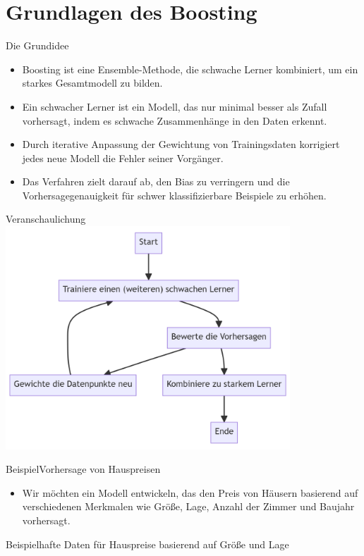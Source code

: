 \documentclass[hyperref={bookmarks=false},11pt,dvipsnames]{beamer}
\begin{document}
\section{Grundlagen des Boosting}
\begin{frame}[t]{Die Grundidee}
	\begin{itemize}
		\item <2-> Boosting ist eine Ensemble-Methode, die schwache Lerner kombiniert,
		      um ein starkes Gesamtmodell zu bilden.
		\item <3-> Ein schwacher Lerner ist ein Modell, das nur minimal besser als Zufall
		      vorhersagt, indem es schwache Zusammenhänge in den Daten erkennt.
		\item <4-> Durch iterative Anpassung der Gewichtung von Trainingsdaten korrigiert jedes
		      neue Modell die Fehler seiner Vorgänger.
		\item <5-> Das Verfahren zielt darauf ab, den Bias zu verringern und die Vorhersagegenauigkeit
		      für schwer klassifizierbare Beispiele zu erhöhen.
	\end{itemize}
\end{frame}

\begin{frame}[t]{Veranschaulichung}
	\centering
	\includegraphics[width=0.8\textwidth]{../Ausarbeitung/figures/Boosting_Graph.png}
\end{frame}
\begin{frame}[t]{Beispiel}{Vorhersage von Hauspreisen}
	\begin{itemize}
		\item <1-> Wir möchten ein Modell entwickeln, das den Preis von
		      Häusern basierend auf verschiedenen Merkmalen wie Größe, Lage, Anzahl der
		      Zimmer und Baujahr vorhersagt.
	\end{itemize}
	\begin{table}
		\centering
		\resizebox{\textwidth}{!}{%
			
		}
		\caption{Beispielhafte Daten für Hauspreise basierend auf Größe und Lage}
	\end{table}


\end{frame}
\end{document}
